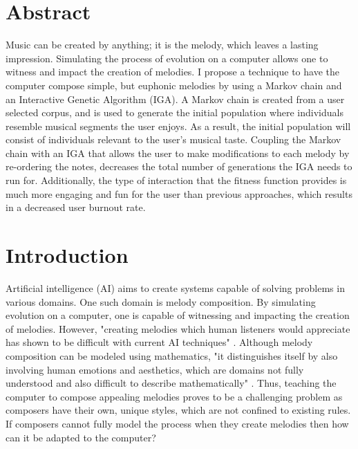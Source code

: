 \documentclass[12pt]{article} %
\begin{document}

\tableofcontents %
\newpage %

\section{Abstract}
Music can be created by anything; it is the melody, which leaves a lasting impression. Simulating the process of evolution on a computer allows one to witness and impact the creation of melodies. I propose a technique to have the computer compose simple, but euphonic melodies by using a Markov chain and an Interactive Genetic Algorithm (IGA). A Markov chain is created from a user selected corpus, and is used to generate the initial population where individuals resemble musical segments the user enjoys. As a result, the initial population will consist of individuals relevant to the user's musical taste. Coupling the Markov chain with an IGA that allows the user to make modifications to each melody by re-ordering the notes, decreases the total number of generations the IGA needs to run for. Additionally, the type of interaction that the fitness function provides is much more engaging and fun for the user than previous approaches, which results in a decreased user burnout rate.

\newpage

\section{Introduction}
Artificial intelligence (AI) aims to create systems capable of solving problems in various domains. One such domain is melody composition. By simulating evolution on a computer, one is capable of witnessing and impacting the creation of melodies. However, "creating melodies which human listeners would appreciate has shown to be difficult with current AI techniques" \cite{Jensen}. Although melody composition can be modeled using mathematics, "it distinguishes itself by also involving human emotions and aesthetics, which are domains not fully understood and also difficult to describe mathematically" \cite{Jensen}. Thus, teaching the computer to compose appealing melodies proves to be a challenging problem as composers have their own, unique styles, which are not confined to existing rules. If composers cannot fully model the process when they create melodies then how can it be adapted to the computer? \\
\end{document}
